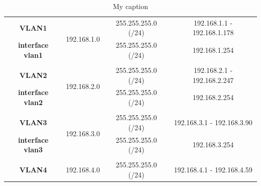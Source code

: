 \documentclass{article}
\begin{document}
\begin{table}[H]
	\centering
	\caption{My caption}
	\begin{tabular}{cccc}
		\hline
		\multicolumn{1}{|c|}{\textbf{VLAN1}}                 & \multicolumn{1}{c|}{\multirow{2}{*}{192.168.1.0}} & \multicolumn{1}{c|}{255.255.255.0 (/24)}     & \multicolumn{1}{c|}{192.168.1.1 - 192.168.1.178} \\ \cline{1-1} \cline{3-4} 
		\multicolumn{1}{|c|}{\textbf{interface vlan1}}       & \multicolumn{1}{c|}{}                             & \multicolumn{1}{c|}{255.255.255.0 (/24)}     & \multicolumn{1}{c|}{192.168.1.254}               \\ \hline
		&                                                   &                                              &                                                  \\ \hline
		\multicolumn{1}{|c|}{\textbf{VLAN2}}                 & \multicolumn{1}{c|}{\multirow{2}{*}{192.168.2.0}} & \multicolumn{1}{c|}{255.255.255.0 (/24)}     & \multicolumn{1}{c|}{192.168.2.1 - 192.168.2.247} \\ \cline{1-1} \cline{3-4} 
		\multicolumn{1}{|c|}{\textbf{interface vlan2}}       & \multicolumn{1}{c|}{}                             & \multicolumn{1}{c|}{255.255.255.0 (/24)}     & \multicolumn{1}{c|}{192.168.2.254}               \\ \hline
		&                                                   &                                              &                                                  \\ \hline
		\multicolumn{1}{|c|}{\textbf{VLAN3}}                 & \multicolumn{1}{c|}{\multirow{2}{*}{192.168.3.0}} & \multicolumn{1}{c|}{255.255.255.0 (/24)}     & \multicolumn{1}{c|}{192.168.3.1 - 192.168.3.90}  \\ \cline{1-1} \cline{3-4} 
		\multicolumn{1}{|c|}{\textbf{interface vlan3}}       & \multicolumn{1}{c|}{}                             & \multicolumn{1}{c|}{255.255.255.0 (/24)}     & \multicolumn{1}{c|}{192.168.3.254}               \\ \hline
		&                                                   &                                              &                                                  \\ \hline
		\multicolumn{1}{|c|}{\textbf{VLAN4}}                 & \multicolumn{1}{c|}{\multirow{2}{*}{192.168.4.0}} & \multicolumn{1}{c|}{255.255.255.0 (/24)}     & \multicolumn{1}{c|}{192.168.4.1 - 192.168.4.59}  \\ \cline{1-1} \cline{3-4} 

\end{tabular}
\end{table}
\end{document}
